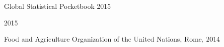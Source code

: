 \onecolumn
{}

\vspace*{100pt}
\begin{center}
\Huge{Global Statistical Pocketbook 2015}
\end{center}

\vspace*{10pt}
\begin{center}
\Huge{2015}
\end{center}

\vfill
\begin{center}
Food and Agriculture Organization of the United Nations, Rome, 2014
\end{center}

\newpage